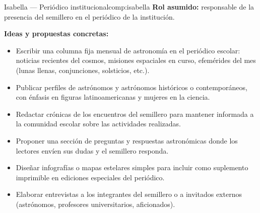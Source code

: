 \begin{compromiso}{Isabella — Periódico institucional}{comp:isabella}
    \textbf{Rol asumido:} responsable de la presencia del semillero en el periódico
    de la institución.

    \medskip
    \textbf{Ideas y propuestas concretas:}
    \begin{itemize}[leftmargin=1.5em]
        \item Escribir una columna fija mensual de astronomía en el periódico escolar:
              noticias recientes del cosmos, misiones espaciales en curso, efemérides
              del mes (lunas llenas, conjunciones, solsticios, etc.).
        \item Publicar perfiles de astrónomos y astrónomos históricos o contemporáneos,
              con énfasis en figuras latinoamericanas y mujeres en la ciencia.
        \item Redactar crónicas de los encuentros del semillero para mantener informada
              a la comunidad escolar sobre las actividades realizadas.
        \item Proponer una sección de preguntas y respuestas astronómicas donde los
              lectores envíen sus dudas y el semillero responda.
        \item Diseñar infografías o mapas estelares simples para incluir como
              suplemento imprimible en ediciones especiales del periódico.
        \item Elaborar entrevistas a los integrantes del semillero o a invitados
              externos (astrónomos, profesores universitarios, aficionados).
    \end{itemize}
\end{compromiso}

